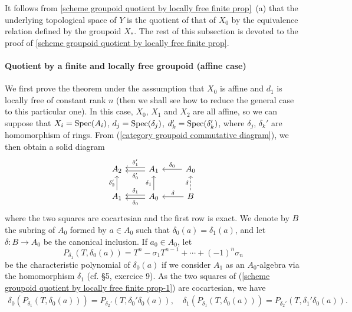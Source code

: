 It follows from \cref{scheme groupoid quotient by locally free finite prop}~(a) that the underlying topological space of $Y$ is the quotient of that of $X_0$ by the equivalence relation defined by the groupoid $X_*$. The rest of this subsection is devoted to the proof of \cref{scheme groupoid quotient by locally free finite prop}.

\paragraph{Quotient by a finite and locally free groupoid (affine case)}\label{scheme groupoid quotient by locally free finite affine case paragraph}
We first prove the theorem under the asssumption that $X_0$ is affine and $d_1$ is locally free of constant rank $n$ (then we shall see how to reduce the general case to this particular one). In this case, $X_0$, $X_1$ and $X_2$ are all affine, so we can suppose that $X_i=\mathrm{Spec}(A_i)$, $d_j=\mathrm{Spec}(\delta_j)$, $d_k'=\mathrm{Spec}(\delta_k')$, where $\delta_j$, $\delta_k'$ are homomorphism of rings. From (\ref{category groupoid commutative diagram}), we then obtain a solid diagram
\begin{equation}\label{scheme groupoid quotient by locally free finite prop-1}
\begin{tikzcd}
A_2&A_1\ar[l,shift left=2pt,"\delta_0'"]\ar[l,shift right=2pt,swap,"\delta_1'"]&A_0\ar[l,swap,"\delta_0"]\\
A_1\ar[u,"\delta_2'"]&A_0\ar[l,shift left=2pt,"\delta_0"]\ar[l,shift right=2pt,swap,"\delta_1"]\ar[u,"\delta_1"]&B\ar[u,dashed,"\delta"]\ar[l,swap,"\delta"]
\end{tikzcd}
\end{equation}
where the two squares are cocartesian and the first row is exact. We denote by $B$ the subring of $A_0$ formed by $a\in A_0$ such that $\delta_0(a)=\delta_1(a)$, and let $\delta:B\to A_0$ be the canonical inclusion. If $a_0\in A_0$, let
\[P_{\delta_1}(T,\delta_0(a))=T^n-\sigma_1T^{n-1}+\cdots+(-1)^n\sigma_n\]
be the characteristic polynomial of $\delta_0(a)$ if we consider $A_1$ as an $A_0$-algebra via the homomorphism $\delta_1$ (cf. \cite{Bourbaki_CA1-7}  \S 5, exercice 9). As the two squares of (\ref{scheme groupoid quotient by locally free finite prop-1}) are cocartesian, we have
\begin{align*}
\delta_0(P_{\delta_1}(T,\delta_0(a)))=P_{\delta_2'}(T,\delta_0'\delta_0(a)),\quad \delta_1(P_{\delta_1}(T,\delta_0(a)))=P_{\delta_2'}(T,\delta_1'\delta_0(a)).
\end{align*}
